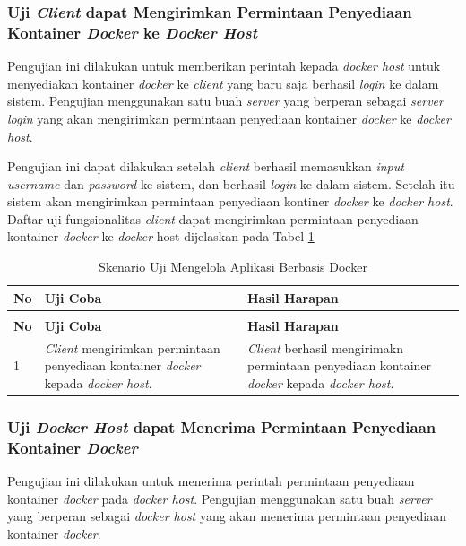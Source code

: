 \subsubsection{Uji \textit{Client} dapat Mengirimkan Permintaan Penyediaan Kontainer \textit{Docker} ke \textit{Docker Host}}
Pengujian ini dilakukan untuk memberikan perintah kepada \textit{docker host} untuk menyediakan kontainer \textit{docker} ke \textit{client} yang baru saja berhasil \textit{login} ke dalam sistem. Pengujian menggunakan satu buah \textit{server} yang berperan sebagai \textit{server login} yang akan mengirimkan permintaan penyediaan kontainer \textit{docker} ke \textit{docker host}.

Pengujian ini dapat dilakukan setelah \textit{client} berhasil memasukkan \textit{input username} dan \textit{password} ke sistem, dan berhasil \textit{login} ke dalam sistem. Setelah itu sistem akan mengirimkan permintaan penyediaan kontiner \textit{docker} ke \textit{docker host}. Daftar uji fungsionalitas \textit{client} dapat mengirimkan permintaan penyediaan kontainer \textit{docker} ke \textit{docker} host dijelaskan pada Tabel \ref{ujicoba2}

\begin{longtable}{|p{}|p{}|p{}|}					\caption{Skenario Uji \textit{Client} dapat \textit{Login} Mengirimkan Permintaan Penyediaan Kontainer \textit{Docker}} \label{ujicoba2} \\
	\hline
	\textbf{No} & \textbf{Uji Coba} & \textbf{Hasil Harapan} \\ \hline
	\endfirsthead
	\caption[]{Skenario Uji Mengelola Aplikasi Berbasis Docker} \\
	\hline
	\textbf{No} & \textbf{Uji Coba} & \textbf{Hasil Harapan} \\ \hline
	\endhead
	\endfoot
	\endlastfoot
	
	1 & \textit{Client} mengirimkan permintaan penyediaan kontainer \textit{docker} kepada \textit{docker host}. & \textit{Client} berhasil mengirimakn permintaan penyediaan kontainer \textit{docker} kepada \textit{docker host}.\\ \hline
\end{longtable}

\subsubsection{Uji \textit{Docker Host} dapat Menerima Permintaan Penyediaan Kontainer \textit{Docker}}
Pengujian ini dilakukan untuk menerima perintah permintaan penyediaan kontainer \textit{docker} pada \textit{docker host}. Pengujian menggunakan satu buah \textit{server} yang berperan sebagai \textit{docker host} yang akan menerima permintaan penyediaan kontainer \textit{docker}.

